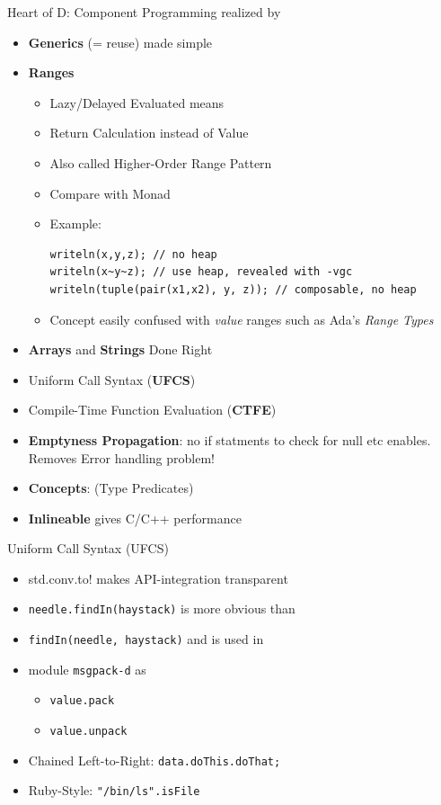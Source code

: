 \documentclass[xcolor=dvipsnames]{beamer}
\begin{document}
\begin{frame}[fragile]{Heart of D: Component Programming realized by}
  \begin{itemize}[<+->]
  \item \textbf{Generics} (= reuse) made simple
  \item \textbf{Ranges}
    \begin{itemize}[<+->]
    \item Lazy/Delayed Evaluated means
    \item Return Calculation instead of Value
    \item Also called Higher-Order Range Pattern
    \item Compare with Monad
    \item Example:
      \begin{lstlisting}[frame=single]
writeln(x,y,z); // no heap
writeln(x~y~z); // use heap, revealed with -vgc
writeln(tuple(pair(x1,x2), y, z)); // composable, no heap
      \end{lstlisting}
    \item Concept easily confused with \emph{value} ranges such as Ada's
      \emph{Range Types}
    \end{itemize}
  \item \textbf{Arrays} and \textbf{Strings} Done Right
  \item Uniform Call Syntax (\textbf{UFCS})
  \item Compile-Time Function Evaluation (\textbf{CTFE})
  \item \textbf{Emptyness Propagation}: no if statments to check for null etc
    enables. Removes Error handling problem!
  \item \textbf{Concepts}: (Type Predicates)
  \item \textbf{Inlineable} gives C/C++ performance
  \end{itemize}
\end{frame}

\begin{frame}[fragile]{Uniform Call Syntax (UFCS)}
  \begin{itemize}[<+->]
  \item std.conv.to! makes API-integration transparent
  \item \texttt{needle.findIn(haystack)} is more obvious than
  \item \texttt{findIn(needle, haystack)} and is used in
  \item module \texttt{msgpack-d} as
    \begin{itemize}[<+->]
    \item \texttt{value.pack}
    \item \texttt{value.unpack}
    \end{itemize}
  \item Chained Left-to-Right: \texttt{data.doThis.doThat;}
  \item Ruby-Style: \texttt{"/bin/ls".isFile}
  \end{itemize}
\end{frame}
\end{document}
